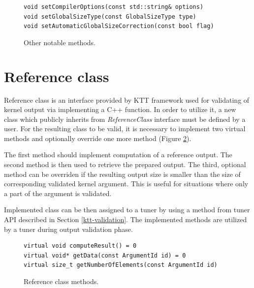 \documentclass
[
    digital, %
    oneside, %
    table, %
    nolof, %
    nolot, %
    nocover %
]{fithesis3}
\begin{document}
\begin{figure}
\begin{adjustwidth}{-1cm}{-1cm}
\begin{lstlisting}
void setCompilerOptions(const std::string& options)
void setGlobalSizeType(const GlobalSizeType type)
void setAutomaticGlobalSizeCorrection(const bool flag)
\end{lstlisting}
\caption{Other notable methods.}
\label{ktt-utility-methods}
\end{adjustwidth}
\end{figure}

\section{Reference class}
\label{ktt-reference-class}
Reference class is an interface provided by KTT framework used for validating of kernel output via implementing a C++ function. In order to utilize it,
a new class which publicly inherits from \textit{ReferenceClass} interface must be defined by a user. For the resulting class to be valid, it is
necessary to implement two virtual methods and optionally override one more method (Figure \ref{ktt-reference-methods}).

The first method should implement computation of a reference output. The second method is then used to retrieve the prepared output. The third, optional
method can be overriden if the resulting output size is smaller than the size of corresponding validated kernel argument. This is useful for situations
where only a part of the argument is validated.

Implemented class can be then assigned to a tuner by using a method from tuner API described in Section \ref{ktt-validation}. The implemented
methods are utilized by a tuner during output validation phase.

\begin{figure}
\begin{adjustwidth}{-1cm}{-1cm}
\begin{lstlisting}
virtual void computeResult() = 0
virtual void* getData(const ArgumentId id) = 0
virtual size_t getNumberOfElements(const ArgumentId id)
\end{lstlisting}
\caption{Reference class methods.}
\label{ktt-reference-methods}
\end{adjustwidth}
\end{figure}
\end{document}

